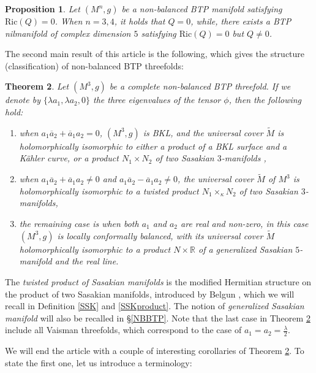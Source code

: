 \documentclass{amsart}
\numberwithin{equation}{section}
\newtheorem{theorem} {Theorem} [section]
\newtheorem{proposition}[theorem]{Proposition}
\theoremstyle{definition}
\renewcommand{\1}{\mathds{1}}
\renewcommand{\>}{\rightarrow}
\begin{document}
\begin{proposition}\label{RicQ}
Let $(M^n,g)$ be a non-balanced BTP manifold satisfying $\mathrm{Ric}(Q)=0$.
When $n=3,4$, it holds that $Q=0$, while, there exists a BTP nilmanifold of complex dimension $5$ satisfying $\mathrm{Ric}(Q)=0$ but $Q \neq 0$.
\end{proposition}


The second main result  of this article is the following, which gives the structure (classification) of non-balanced BTP threefolds:

\begin{theorem}\label{3DNBBTP}
Let $(M^3,g)$ be a complete non-balanced BTP threefold. If we denote by $\{ \lambda a_1, \lambda a_2,0\}$ the three eigenvalues of the tensor $\phi$, then the following hold:
\begin{enumerate}
\item\label{BKL} when $a_1\overline{a}_2+\overline{a}_1a_2 = 0$, $(M^3,g)$ is BKL, and the universal cover $\widetilde{M}$ is holomorphically isomorphic to either a product of a BKL surface and a K\"ahler curve, or a product $N_1 \times N_2$ of two Sasakian $3$-manifolds ,
\item\label{twSSK} when $a_1\overline{a}_2+\overline{a}_1a_2 \neq 0$ and $a_1\overline{a}_2-\overline{a}_1a_2 \neq 0$, the universal cover $\widetilde{M}$ of $M^3$ is holomorphically isomorphic to a twisted product $N_1 \times_{\kappa} N_2 $ of two Sasakian $3$-manifolds,

\item\label{gV} the remaining case is when both $a_1$ and $a_2$ are real and non-zero, in this case $(M^3,g)$ is locally conformally balanced, with its universal cover $\widetilde{M}$ holomorphically isomorphic to a product $N \times \mathbb{R}$ of a generalized Sasakian $5$-manifold and the real line.
\end{enumerate}
\end{theorem}
The {\em twisted product of Sasakian manifolds} is the modified Hermitian structure on the product of two Sasakian manifolds, introduced by Belgun \cite{B12}, which we will recall in Definition \ref{SSK} and \ref{SSKproduct}.
The notion of {\em generalized Sasakian manifold} will also be recalled in \S \ref{NBBTP}. Note that the last case in Theorem \ref{3DNBBTP} include all Vaisman threefolds, which correspond to the case of $a_1=a_2=\frac{\lambda }{2}$.

We will end the article with a couple of interesting corollaries of Theorem \ref{3DNBBTP}. To state the first one, let us introduce a terminology:
\end{document}
